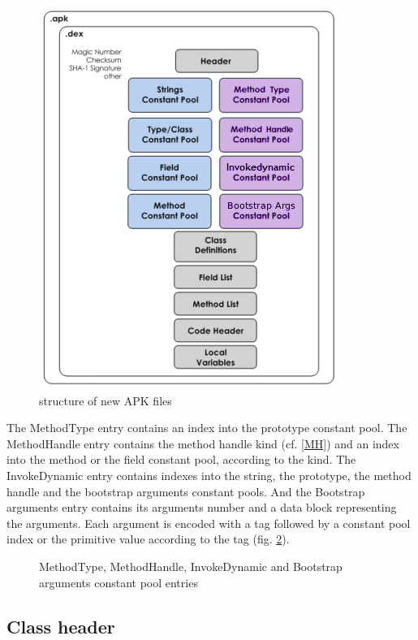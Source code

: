 \documentclass{sigplanconf}
\begin{document}
    \begin{figure}[!h]
      \centering \includegraphics[width=.5\columnwidth]{structure-apk-292.png}
      \caption{structure of new APK files}
      \label{SNA}
    \end{figure}

    The MethodType entry contains an index into the prototype constant pool.
    The MethodHandle entry contains the method handle kind (cf. \ref{MH})
    and an index into the method or the field constant pool, according to the kind.
    The InvokeDynamic entry contains indexes into the string, the prototype,
    the method handle and the bootstrap arguments constant pools.
    And the Bootstrap arguments entry contains its arguments number
    and a data block representing the arguments.
    Each argument is encoded with a tag
    followed by a constant pool index or the primitive value according to the tag
    (fig. \ref{DVMstruct}).

    \begin{figure}[!h]
      \centering 
      \centering 
      \centering 
      \centering 
      \caption{MethodType, MethodHandle, InvokeDynamic and Bootstrap arguments constant pool entries}
      \label{DVMstruct}
    \end{figure}

  \subsection{Class header}
\end{document}
